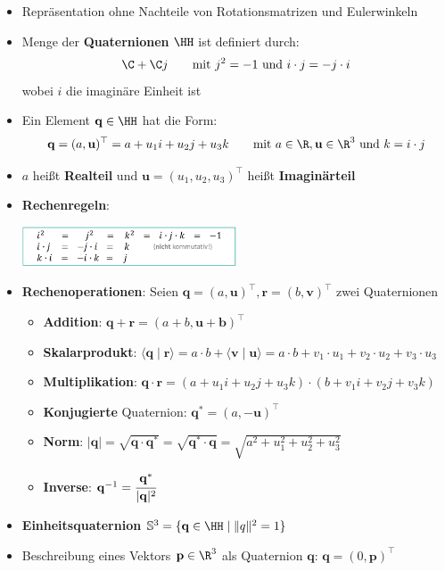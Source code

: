 \begin{itemize}
	\item Repräsentation ohne Nachteile von Rotationsmatrizen und Eulerwinkeln
	\item Menge der \textbf{Quaternionen} $\HH$ ist definiert durch:
	$$\C+\C j\qquad \text{mit } j^2=-1 \text{ und } i\cdot j=-j\cdot i$$
	wobei $i$ die imaginäre Einheit ist
	\item Ein Element $\mathbf{q}\in\HH$ hat die Form:
	$$\mathbf{q}=(a,\mathbf{u})^\top=a+u_1i+u_2j+u_3k\qquad \text{mit } a\in\R,\mathbf{u}\in\R^3\text{ und }k=i\cdot j$$
	\item $a$ heißt \textbf{Realteil} und $\mathbf{u}=(u_1,u_2,u_3)^\top$ heißt \textbf{Imaginärteil}
	\item \textbf{Rechenregeln}:
	\begin{center}
		\includegraphics[width=0.5\textwidth]{images/quaternionen.png}
	\end{center}
	\item \textbf{Rechenoperationen}: Seien $\mathbf{q}=(a,\mathbf{u})^\top, \mathbf{r}=(b,\mathbf{v})^\top$ zwei Quaternionen
	\begin{itemize}
		\item \textbf{Addition}: $\mathbf{q}+\mathbf{r}=(a+b,\mathbf{u}+\mathbf{b})^\top$
		\item \textbf{Skalarprodukt}: $\langle \mathbf{q}\mid\mathbf{r}\rangle=a\cdot b+\langle \mathbf{v}\mid\mathbf{u}\rangle=a\cdot b+v_1\cdot u_1+v_2\cdot u_2+v_3\cdot u_3$
		\item \textbf{Multiplikation}: $\mathbf{q}\cdot\mathbf{r}=(a+u_1i+u_2j+u_3k)\cdot (b+v_1i+v_2j+v_3k)$
		\item \textbf{Konjugierte} Quaternion: $\mathbf{q^*}=(a,-\mathbf{u})^\top$
		\item \textbf{Norm}: $|\mathbf{q}|=\sqrt{\mathbf{q}\cdot\mathbf{q^*}}=\sqrt{\mathbf{q^*}\cdot\mathbf{q}}=\sqrt{a^2+u_1^2+u_2^2+u_3^2}$
		\item \textbf{Inverse}: $\mathbf{q}^{-1}=\cfrac{\mathbf{q^*}}{|\mathbf{q}|^2}$
	\end{itemize}
	\item \textbf{Einheitsquaternion} $\mathbb{S}^3=\{\mathbf{q}\in\HH\mid\lVert q \rVert^2=1\}$
	\item Beschreibung eines Vektors $\mathbf{p}\in\R^3$ als Quaternion $\mathbf{q}$: $\mathbf{q}=(0,\mathbf{p})^\top$

\end{itemize}
